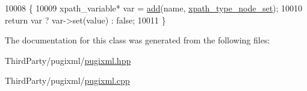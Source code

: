 \begin{DoxyCode}
10008     \{
10009         xpath\_variable* var = \hyperlink{classpugi_1_1xpath__variable__set_a07051524f1c6a54bf8f16c9506d6ed5e}{add}(name, \hyperlink{namespacepugi_ae3820874caf240e9f311bfd2790a84d6af5613748204e2e4861524e7d63a699c9}{xpath\_type\_node\_set});
10010         \textcolor{keywordflow}{return} var ? var->set(value) : \textcolor{keyword}{false};
10011     \}
\end{DoxyCode}


The documentation for this class was generated from the following files\-:\begin{DoxyCompactItemize}
\item 
Third\-Party/pugixml/\hyperlink{pugixml_8hpp}{pugixml.\-hpp}\item 
Third\-Party/pugixml/\hyperlink{pugixml_8cpp}{pugixml.\-cpp}\end{DoxyCompactItemize}

